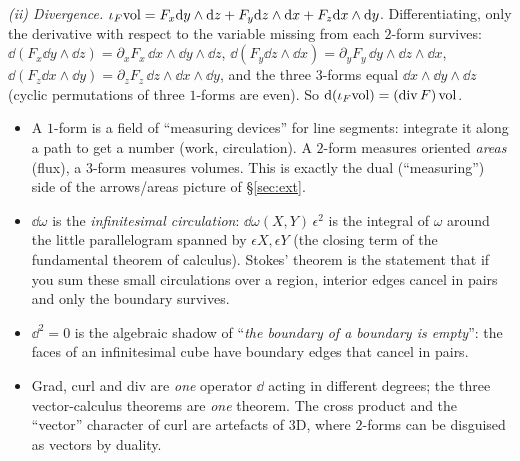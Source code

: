 \emph{(ii) Divergence.} $\iota_F\mathrm{vol}=F_x\mathrm{d} y\wedge\mathrm{d} z+F_y\mathrm{d} z\wedge\mathrm{d} x+F_z\mathrm{d} x\wedge\mathrm{d} y$. Differentiating, only the derivative with respect to the variable missing from each $2$-form survives:
$\dd(F_x\dd y\wedge\dd z)=\partial_xF_x\,\dd x\wedge\dd y\wedge\dd z$, $\dd(F_y\dd z\wedge\dd x)=\partial_yF_y\,\dd y\wedge\dd z\wedge\dd x$, $\dd(F_z\dd x\wedge\dd y)=\partial_zF_z\,\dd z\wedge\dd x\wedge\dd y$,
and the three $3$-forms equal $\dd x\wedge\dd y\wedge\dd z$ (cyclic permutations of three $1$-forms are even). So $\mathrm{d}(\iota_F\mathrm{vol})=(\operatorname{div}F)\,\mathrm{vol}$.

\begin{intuition}
\begin{itemize}
  \item A $1$-form is a field of ``measuring devices'' for line segments: integrate it along a path to get a number (work, circulation). A $2$-form measures oriented \emph{areas} (flux), a $3$-form measures volumes. This is exactly the dual (``measuring'') side of the arrows/areas picture of \S\ref{sec:ext}.
  \item $\dd\omega$ is the \emph{infinitesimal circulation}: $\dd\omega(X,Y)\,\epsilon^2$ is the integral of $\omega$ around the little parallelogram spanned by $\epsilon X,\epsilon Y$ (the closing term of the fundamental theorem of calculus). Stokes' theorem is the statement that if you sum these small circulations over a region, interior edges cancel in pairs and only the boundary survives.
  \item $\dd^2=0$ is the algebraic shadow of ``\emph{the boundary of a boundary is empty}'': the faces of an infinitesimal cube have boundary edges that cancel in pairs.
  \item Grad, curl and div are \emph{one} operator $\dd$ acting in different degrees; the three vector-calculus theorems are \emph{one} theorem. The cross product and the ``vector'' character of curl are artefacts of $3$D, where $2$-forms can be disguised as vectors by duality.
\end{itemize}
\end{intuition}


